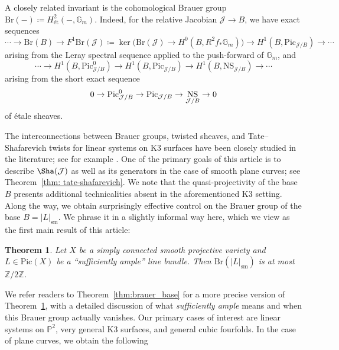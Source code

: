\documentclass[11pt]{amsart}
\theoremstyle{plain}
\newtheorem{thm}{Theorem}[section]
\theoremstyle{definition}
\theoremstyle{remark}
\newcommand{\Pic}{\mathop{\rm Pic}\nolimits}
\DeclareMathOperator{\NS}{NS}
\begin{document}
A closely related invariant is the cohomological Brauer group $\mathrm{Br}(-)\coloneq H^2_{\textrm{ét}}(-,\mathbb G_m)$. Indeed, for the relative Jacobian $\mathcal{J} \to B$, we have exact sequences
\begin{equation}\label{eq: leray intro}
\cdots \to \mathrm{Br}(B) \to F^1 \mathrm{Br}(\mathcal{J}) \coloneq \ker\big(\mathrm{Br}(\mathcal{J}) \to H^0(B, R^2 f_* \mathbb G_m)\big) \to H^1(B, \mathrm{Pic}_{\mathcal{J}/B}) \to \cdots
\end{equation}
arising from the Leray spectral sequence applied to the push-forward of $\mathbb G_m$, and 
\begin{equation}\label{eq: exponential intro}
\cdots \to H^1(B, \mathrm{Pic}^0_{\mathcal{J}/B}) \to H^1(B, \mathrm{Pic}_{\mathcal{J}/B}) \to  H^1(B, \mathrm{NS}_{\mathcal{J}/B}) \to \cdots
\end{equation}
arising from the short exact sequence
$$0 \to \Pic^0_{\mathcal J / B} \to \Pic_{\mathcal J/B} \to \NS_{\mathcal J/B} \to 0$$ of \'etale sheaves.

The interconnections between Brauer groups, twisted sheaves, and Tate--Shafarevich twists for linear systems on K3 surfaces have been closely studied in the literature; see for example \cite{Markman, HM1, Mattei-Meinsma, HM2}. 
One of the primary goals of this article is to describe $\Sha(\mathcal{J})$ as well as its generators in the case of smooth plane curves; see Theorem~\ref{thm: tate-shafarevich}. We note that the quasi-projectivity of the base $B$ presents additional technicalities absent in the aforementioned 
K3 setting. Along the way, we obtain surprisingly effective control on the Brauer group of the base $B = |L|_\mathrm{sm}$. We phrase it in a slightly informal way here, which we view as the first main result of this article:


\begin{thm}\label{thm: br base intro}
    Let $X$ be a simply connected smooth projective variety and $L\in \mathrm{Pic}(X)$ be a ``sufficiently ample'' line bundle. Then $\mathrm{Br}(|L|_\mathrm{sm})$ is at most $\mathbb Z/ 2 \mathbb Z$.
\end{thm}

We refer readers to Theorem~\ref{thm:brauer_base} for a more precise version of Theorem~\ref{thm: br base intro}, with a detailed discussion of what \textit{sufficiently ample} means and when this Brauer group actually vanishes. Our primary cases of interest are linear systems on $\mathbb P^2$, very general K3 surfaces, and general cubic fourfolds. In the case of plane curves, we obtain the following
\end{document}
